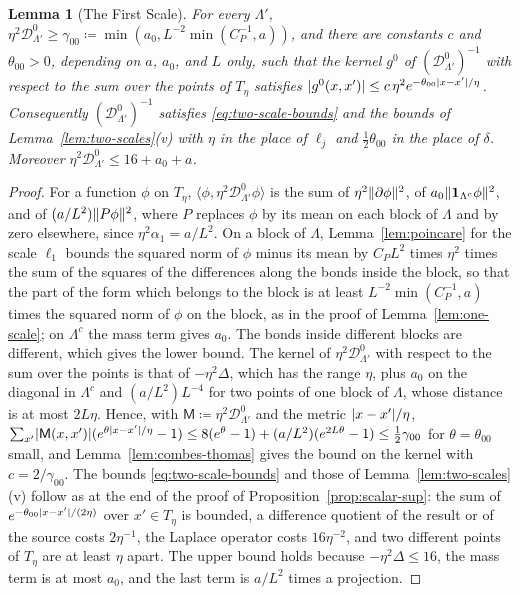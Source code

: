 \documentclass[11pt]{preprint}
\DeclarePairedDelimiter{\abs}{\lvert}{\rvert}
\DeclarePairedDelimiter{\norm}{\lVert}{\rVert}
\numberwithin{equation}{section}
\newtheorem{lemma}[theorem]{Lemma}
\theoremstyle{definition}
\theoremstyle{remark}
\theoremstyle{plain}
\begin{document}
\begin{lemma}[The First Scale]\label{lem:first-scale}
For every $\Lambda'$, $\eta^2\mathcal D^0_{\Lambda'} \geq \gamma_{00} \coloneqq \min(a_0, L^{-2}\min(C_P^{-1}, a))$, and there are constants $c$ and $\theta_{00} > 0$, depending on $a$, $a_0$, and $L$ only, such that the kernel $g^0$ of $(\mathcal D^0_{\Lambda'})^{-1}$ with respect to the sum over the points of $T_\eta$ satisfies $\abs{g^0(x, x')} \leq c\,\eta^2e^{-\theta_{00}\abs{x - x'}/\eta}$. Consequently $(\mathcal D^0_{\Lambda'})^{-1}$ satisfies \eqref{eq:two-scale-bounds} and the bounds of Lemma~\ref{lem:two-scales}(v) with $\eta$ in the place of $\ell_j$ and $\frac12\theta_{00}$ in the place of $\delta$. Moreover $\eta^2\mathcal D^0_{\Lambda'} \leq 16 + a_0 + a$.
\end{lemma}

\begin{proof}
For a function $\phi$ on $T_\eta$, $\langle\phi, \eta^2\mathcal D^0_{\Lambda'}\phi\rangle$ is the sum of $\eta^2\norm{\partial\phi}^2$, of $a_0\norm{\mathbf 1_{\Lambda^c}\phi}^2$, and of $(a/L^2)\norm{P\phi}^2$, where $P$ replaces $\phi$ by its mean on each block of $\Lambda$ and by zero elsewhere, since $\eta^2\alpha_1 = a/L^2$. On a block of $\Lambda$, Lemma~\ref{lem:poincare} for the scale $\ell_1$ bounds the squared norm of $\phi$ minus its mean by $C_PL^2$ times $\eta^2$ times the sum of the squares of the differences along the bonds inside the block, so that the part of the form which belongs to the block is at least $L^{-2}\min(C_P^{-1}, a)$ times the squared norm of $\phi$ on the block, as in the proof of Lemma~\ref{lem:one-scale}; on $\Lambda^c$ the mass term gives $a_0$. The bonds inside different blocks are different, which gives the lower bound. The kernel of $\eta^2\mathcal D^0_{\Lambda'}$ with respect to the sum over the points is that of $-\eta^2\Delta$, which has the range $\eta$, plus $a_0$ on the diagonal in $\Lambda^c$ and $(a/L^2)L^{-4}$ for two points of one block of $\Lambda$, whose distance is at most $2L\eta$. Hence, with $\mathsf M \coloneqq \eta^2\mathcal D^0_{\Lambda'}$ and the metric $\abs{x - x'}/\eta$, $\sum_{x'}\abs{\mathsf M(x, x')}(e^{\theta\abs{x - x'}/\eta} - 1) \leq 8(e^\theta - 1) + (a/L^2)(e^{2L\theta} - 1) \leq \frac12\gamma_{00}$ for $\theta = \theta_{00}$ small, and Lemma~\ref{lem:combes-thomas} gives the bound on the kernel with $c = 2/\gamma_{00}$. The bounds \eqref{eq:two-scale-bounds} and those of Lemma~\ref{lem:two-scales}(v) follow as at the end of the proof of Proposition~\ref{prop:scalar-sup}: the sum of $e^{-\theta_{00}\abs{x - x'}/(2\eta)}$ over $x' \in T_\eta$ is bounded, a difference quotient of the result or of the source costs $2\eta^{-1}$, the Laplace operator costs $16\eta^{-2}$, and two different points of $T_\eta$ are at least $\eta$ apart. The upper bound holds because $-\eta^2\Delta \leq 16$, the mass term is at most $a_0$, and the last term is $a/L^2$ times a projection.
\end{proof}
\end{document}
